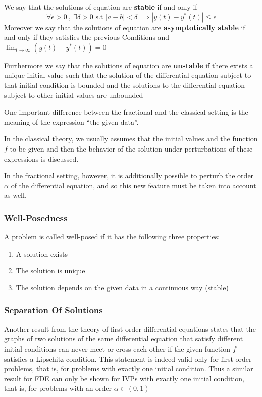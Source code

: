 We say that the solutions of equation are \textbf{stable} if and only if
\[
    \forall \epsilon >0 \  , \ \exists \delta >0 \text{  s.t  } |a-b| < \delta \implies |y(t) - y^*(t)| \leq \epsilon
\]
Moreover we say that the solutions of equation are \textbf{asymptotically stable} if and only if they
satisfies the previous Conditions and $\displaystyle \lim_{t \to \infty} (y(t) - y^*(t)) = 0$

Furthermore we say that the solutions of equation are \textbf{unstable}
if there exists a unique initial value such that the solution of the differential 
equation subject to that initial condition is bounded and the solutions to the 
differential equation subject to other initial values are unbounded


One important difference between the fractional and the classical setting is the meaning of the expression “the given data”.

In the classical theory, we usually assumes that the initial values and the function $f$ to be given
and then the behavior of the solution under perturbations of these expressions is discussed. 

In the fractional setting, however, it is additionally possible to perturb the order $\alpha$ of 
the differential equation, and so this new feature must be taken into account as well. 

\subsubsection*{Well-Posedness}
A problem is called well-posed if it has the following three properties:
\begin{enumerate}
    \item A solution exists
    \item The solution is unique
    \item The solution depends on the given data in a continuous way (stable)
\end{enumerate}

\subsubsection{Separation Of Solutions}
Another result from the theory of first order differential equations states that
the graphs of two solutions of the same differential equation that satisfy different initial
conditions can never meet or cross each other if the given function $f$ satisfies a Lipschitz
condition. This statement is indeed valid only for first-order problems, that is,
for problems with exactly one initial condition. Thus a similar result for FDE can only be shown 
for IVPs with exactly one initial condition, that is, for problems with an order $\alpha \in (0, 1)$

